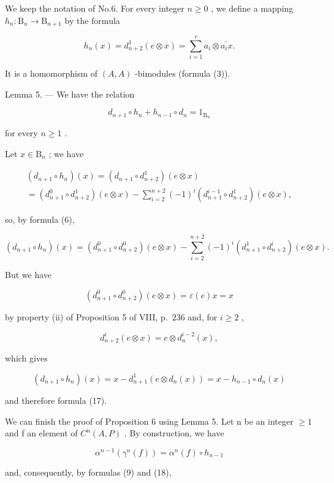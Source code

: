 We keep the notation of No.6. For every integer \(n \geqslant 0\) , we define a mapping \(h_n: \mathrm{B}_n \to \mathrm{B}_{n+1}\) by the formula

\[
h _ {n} (x) = d _ {n + 2} ^ {1} (e \otimes x) = \sum_ {i = 1} ^ {r} a _ {i} \otimes a _ {i} ^ {\prime} x.
\]

It is a homomorphism of \((A, A)\) -bimodules (formula (3)).

Lemma 5. --- We have the relation

\[
d _ {n + 1} \circ h _ {n} + h _ {n - 1} \circ d _ {n} = 1 _ {\mathrm{B} _ {n}}\tag{17}
\]

for every \(n \geqslant 1\) .

Let \(x\in \mathrm{B}_n\) ; we have

\[
\begin{array}{c} (d _ {n + 1} \circ h _ {n}) (x) = (d _ {n + 1} \circ d _ {n + 2} ^ {1}) (e \otimes x) \\ = (d _ {n + 1} ^ {0} \circ d _ {n + 2} ^ {1}) (e \otimes x) - \sum_ {i = 2} ^ {n + 2} (- 1) ^ {i} (d _ {n + 1} ^ {i - 1} \circ d _ {n + 2} ^ {1}) (e \otimes x), \end{array}
\]

so, by formula (6),

\[
(d _ {n + 1} \circ h _ {n}) (x) = (d _ {n + 1} ^ {0} \circ d _ {n + 2} ^ {0}) (e \otimes x) - \sum_ {i = 2} ^ {n + 2} (- 1) ^ {i} (d _ {n + 1} ^ {1} \circ d _ {n + 2} ^ {i}) (e \otimes x).
\]

But we have

\[
(d _ {n + 1} ^ {0} \circ d _ {n + 2} ^ {0}) (e \otimes x) = \varepsilon (e) x = x
\]

by property (ii) of Proposition 5 of VIII, p.~236 and, for \(i \geqslant 2\) ,

\[
d _ {n + 2} ^ {i} (e \otimes x) = e \otimes d _ {n} ^ {i - 2} (x),
\]

which gives

\[
(d _ {n + 1} \circ h _ {n}) (x) = x - d _ {n + 1} ^ {1} (e \otimes d _ {n} (x)) = x - h _ {n - 1} \circ d _ {n} (x)
\]

and therefore formula (17).

We can finish the proof of Proposition 6 using Lemma 5. Let n be an integer \(\geqslant 1\) and f an element of \(C^{n}(A,P)\) . By construction, we have

\[
\alpha^ {n - 1} (\gamma^ {n} (f)) = \alpha^ {n} (f) \circ h _ {n - 1}\tag{18}
\]

and, consequently, by formulas (9) and (18),

